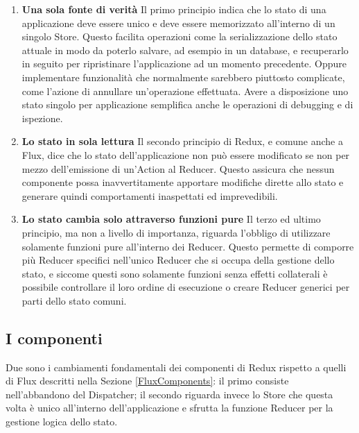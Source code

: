 \begin{enumerate}
    \item \textbf{Una sola fonte di verità} Il primo principio indica che lo stato di una applicazione deve essere unico e deve essere memorizzato all'interno di un singolo Store.
    Questo facilita operazioni come la serializzazione dello stato attuale in modo da poterlo salvare, ad esempio in un database, e recuperarlo in seguito per ripristinare l'applicazione ad un momento precedente. Oppure implementare funzionalità che normalmente sarebbero piuttosto complicate, come l'azione di annullare un'operazione effettuata.
    Avere a disposizione uno stato singolo per applicazione semplifica anche le operazioni di debugging e di ispezione.

    \item \textbf{Lo stato in sola lettura} Il secondo principio di Redux, e comune anche a Flux, dice che lo stato dell'applicazione non può essere modificato se non per mezzo dell'emissione di un'Action al Reducer. Questo assicura che nessun componente possa inavvertitamente apportare modifiche dirette allo stato e generare quindi comportamenti inaspettati ed imprevedibili.

    \item \textbf{Lo stato cambia solo attraverso funzioni pure} Il terzo ed ultimo principio, ma non a livello di importanza, riguarda l'obbligo di utilizzare solamente funzioni pure all'interno dei Reducer. Questo permette di comporre più Reducer specifici nell'unico Reducer che si occupa della gestione dello stato, e siccome questi sono solamente funzioni senza effetti collaterali è possibile controllare il loro ordine di esecuzione o creare Reducer generici per parti dello stato comuni.
\end{enumerate}

\subsection{I componenti}
Due sono i cambiamenti fondamentali dei componenti di Redux rispetto a quelli di Flux descritti nella Sezione \ref{FluxComponents}: il primo consiste nell'abbandono del Dispatcher; il secondo riguarda invece lo Store che questa volta è unico all'interno dell'applicazione e sfrutta la funzione Reducer per la gestione logica dello stato.

